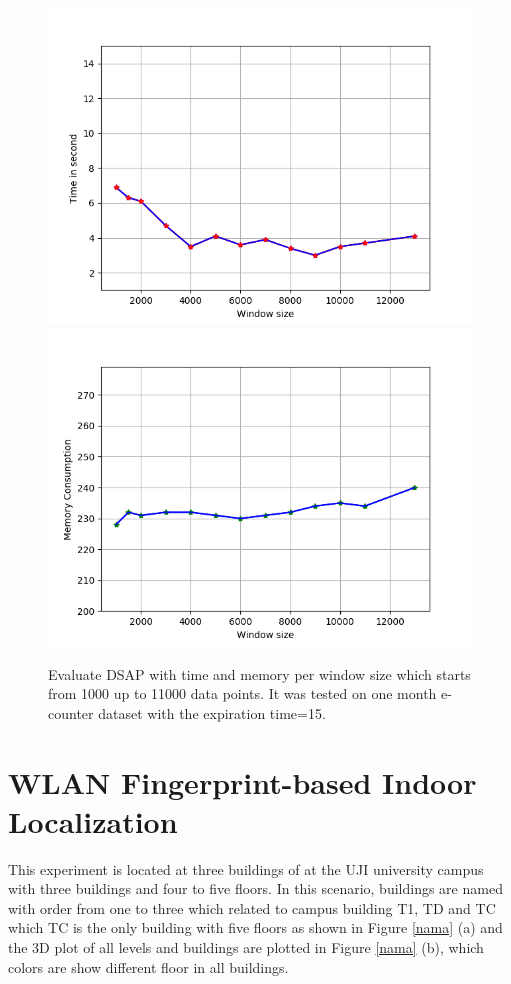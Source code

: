\documentclass[../UNBThesis2.tex]{subfiles}
\begin{document}
\begin{figure}[!h]
    \centering
    \includegraphics[width = 7.5 cm]{image/Chapters/Chapter6/time.point.lessinitial.png}\hfill
    \includegraphics[width = 7.5 cm]{image/Chapters/Chapter6/mem.point.lessinitial.png}
    \\[\smallskipamount]    
    \caption{ Evaluate DSAP with time and memory per window size which starts from 1000 up to 11000 data points. It was tested on one month e-counter dataset with the expiration time=15.}
    \label{4}
\end{figure}












\section{WLAN Fingerprint-based Indoor Localization}

This experiment is located at three buildings of at the UJI university campus with three buildings and four to five floors. In this scenario, buildings are named with order from one to three which related to campus building T1, TD and TC which TC is the only building with five floors as shown in Figure \ref{nama} (a) and the 3D plot of all levels and buildings are plotted in Figure \ref{nama} (b), which colors are show different floor in all buildings. 
\end{document}
